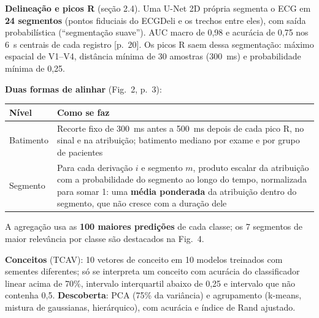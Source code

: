 \documentclass[11pt,a4paper]{article}
\begin{document}
\textbf{Delineação e picos R} (seção 2.4). Uma U-Net 2D própria segmenta o ECG em \textbf{24 segmentos} (pontos fiduciais do ECGDeli e os trechos entre eles), com saída probabilística (``segmentação suave''). AUC macro de 0,98 e acurácia de 0,75 nos 6~s centrais de cada registro [p.~20]. Os picos R saem dessa segmentação: máximo espacial de V1--V4, distância mínima de 30 amostras (300~ms) e probabilidade mínima de 0,25.

\textbf{Duas formas de alinhar} (Fig.~2, p.~3):
\begin{center}\small
\begin{tabularx}{\linewidth}{p{3.2cm}X}
\toprule
\textbf{Nível} & \textbf{Como se faz} \\
\midrule
Batimento & Recorte fixo de 300~ms antes a 500~ms depois de cada pico R, no sinal e na atribuição; batimento mediano por exame e por grupo de pacientes \\ \addlinespace
Segmento & Para cada derivação $i$ e segmento $m$, produto escalar da atribuição com a probabilidade do segmento ao longo do tempo, normalizada para somar 1: uma \textbf{média ponderada} da atribuição dentro do segmento, que não cresce com a duração dele \\
\bottomrule
\end{tabularx}
\end{center}
A agregação usa as \textbf{100 maiores predições} de cada classe; os 7 segmentos de maior relevância por classe são destacados na Fig.~4.

\textbf{Conceitos} (TCAV): 10 vetores de conceito em 10 modelos treinados com sementes diferentes; só se interpreta um conceito com acurácia do classificador linear acima de 70\%, intervalo interquartil abaixo de 0,25 e intervalo que não contenha 0,5. \textbf{Descoberta}: PCA (75\% da variância) e agrupamento (k-means, mistura de gaussianas, hierárquico), com acurácia e índice de Rand ajustado.
\end{document}
